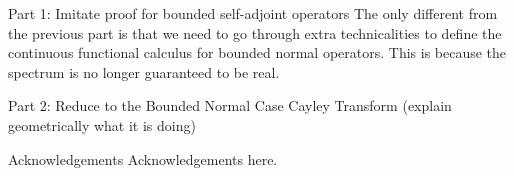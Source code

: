 \documentclass{beamer}
\theoremstyle{plain}
\theoremstyle{definition}
\begin{document}
\begin{frame}{Part 1: Imitate proof for bounded self-adjoint operators}
    The only different from the previous part is that we need to go through extra technicalities to define the continuous functional calculus for bounded normal operators. This is because the spectrum is no longer guaranteed to be real.
\end{frame}

\begin{frame}{Part 2: Reduce to the Bounded Normal Case}
    Cayley Transform (explain geometrically what it is doing)
\end{frame}

\begin{frame}{Acknowledgements}
    Acknowledgements here.
\end{frame}
\end{document}
